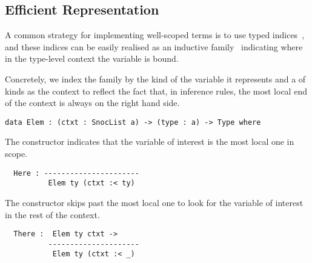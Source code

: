 \subsection{Efficient \DeBruijn{} Representation}
\label{sec:design:deBruijn}

A common strategy for implementing well-scoped terms is to use typed
\emph{\DeBruijn{}} indices~\cite{MANUAL:journals/math/debruijn72}, and these indices can be easily realised as an inductive family~\cite{DBLP:journals/fac/Dybjer94}
indicating where in the type-level context the variable is bound.

Concretely, we index the  family by the kind of the variable it represents and a  of kinds as the context to reflect the fact that,
in inference rules, the most local end of the context is always on the right hand side.

\begin{minipage}{0.10\textwidth}
\varRule
\end{minipage}\hfill
\begin{minipage}{0.80\textwidth}
\begin{Verbatim}
data Elem : (ctxt : SnocList a) -> (type : a) -> Type where
\end{Verbatim}
\end{minipage}

The  constructor indicates that the variable of interest is
the most local one in scope.
%

\begin{minipage}{0.35\textwidth}
  \varZero
\end{minipage}\hfill
\begin{minipage}{0.55\textwidth}
\begin{Verbatim}
  Here : ----------------------
          Elem ty (ctxt :< ty)
\end{Verbatim}
\end{minipage}

The  constructor skips past the most local one to look for
the variable of interest in the rest of the context.

\begin{minipage}{0.35\textwidth}
  \varSuc
\end{minipage}\hfill
\begin{minipage}{0.55\textwidth}
\begin{Verbatim}
  There :  Elem ty ctxt ->
          ---------------------
           Elem ty (ctxt :< _)
\end{Verbatim}
\end{minipage}


